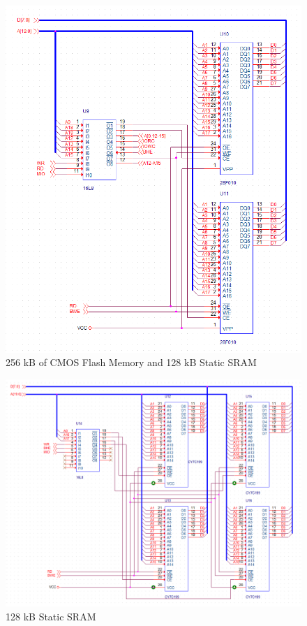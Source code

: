 \begin{appendices}
        \begin{figure}[ht]
            \begin{center}
                \includegraphics[width=1\textwidth]{figures/schematics/flash_mem.png}
                \caption{256 kB of CMOS Flash Memory and 128 kB Static SRAM} \label{fig:page3}
            \end{center}
        \end{figure}

        \begin{figure}[ht]
            \begin{center}
                \includegraphics[width=1\textwidth]{figures/schematics/sram.png}
                \caption{128 kB Static SRAM} \label{fig:page4}
            \end{center}
        \end{figure}


\end{appendices}
